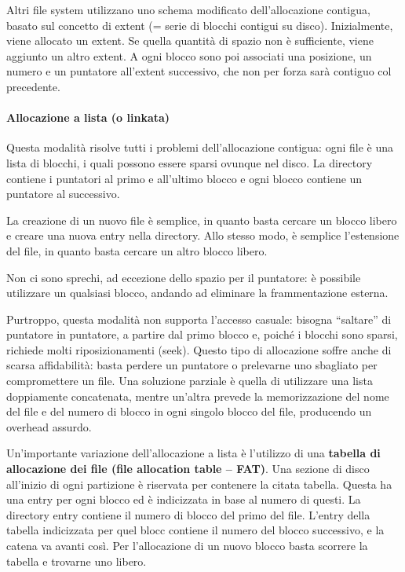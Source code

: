 \documentclass[a4paper]{article}
\begin{document}
Altri file system utilizzano uno schema modificato dell'allocazione contigua, basato sul concetto di extent (= serie di blocchi contigui su disco). Inizialmente, viene allocato un extent. Se quella quantità di spazio non è sufficiente, viene aggiunto un altro extent. A ogni blocco sono poi associati una posizione, un numero e un puntatore all'extent successivo, che non per forza sarà contiguo col precedente.

\paragraph{Allocazione a lista (o linkata)}
Questa modalità risolve tutti i problemi dell'allocazione contigua: ogni file è una lista di blocchi, i quali possono essere sparsi ovunque nel disco. La directory contiene i puntatori al primo e all'ultimo blocco e ogni blocco contiene un puntatore al successivo.

La creazione di un nuovo file è semplice, in quanto basta cercare un blocco libero e creare una nuova entry nella directory. Allo stesso modo, è semplice l'estensione del file, in quanto basta cercare un altro blocco libero.

Non ci sono sprechi, ad eccezione dello spazio per il puntatore: è possibile utilizzare un qualsiasi blocco, andando ad eliminare la frammentazione esterna.

Purtroppo, questa modalità non supporta l'accesso casuale: bisogna ``saltare'' di puntatore in puntatore, a partire dal primo blocco e, poiché i blocchi sono sparsi, richiede molti riposizionamenti (seek). Questo tipo di allocazione soffre anche di scarsa affidabilità: basta perdere un puntatore o prelevarne uno sbagliato per compromettere un file. Una soluzione parziale è quella di utilizzare una lista doppiamente concatenata, mentre un'altra prevede la memorizzazione del nome del file e del numero di blocco in ogni singolo blocco del file, producendo un overhead assurdo.

Un'importante variazione dell'allocazione a lista è l'utilizzo di una \textbf{tabella di allocazione dei file (file allocation table -- FAT)}. Una sezione di disco all'inizio di ogni partizione è riservata per contenere la citata tabella. Questa ha una entry per ogni blocco ed è indicizzata in base al numero di questi. La directory entry contiene il numero di blocco del primo del file. L'entry della tabella indicizzata per quel blocc contiene il numero del blocco successivo, e la catena va avanti così. Per l'allocazione di un nuovo blocco basta scorrere la tabella e trovarne uno libero.
\end{document}
